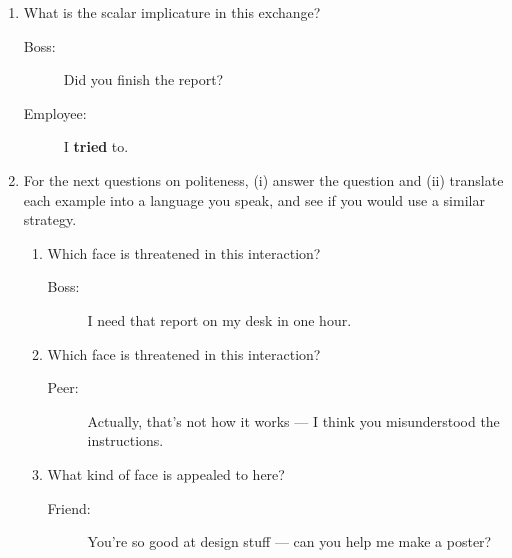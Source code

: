 \documentclass[a4paper]{article}
\begin{document}
\begin{enumerate}
\item What is the scalar implicature in this exchange?
  \begin{description}
    \item[Boss:] Did you finish the report?
    \item[Employee:] I \textbf{tried} to.
  \end{description}

\item For the next questions on politeness, (i) answer the question and (ii) translate each example into a language you speak, and see if you would use a similar strategy.
\begin{enumerate}

\item Which face is threatened in this interaction?
  \begin{description}
    \item[Boss:] I need that report on my desk in one hour.
  \end{description}
 \item Which face is threatened in this interaction?

 \begin{description}
    \item[Peer:] Actually, that’s not how it works — I think you misunderstood the instructions.
  \end{description}

\item What kind of face is appealed to here?
  \begin{description}
    \item[Friend:] You’re so good at design stuff — can you help me make a poster?
  \end{description}


\end{enumerate}
\end{enumerate}
\end{document}
